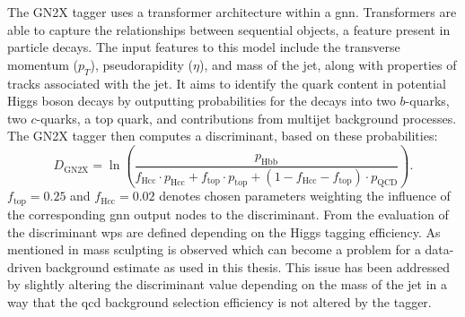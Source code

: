 The GN2X tagger uses a transformer architecture \citep{ATL-PHYS-PUB-2023-021} within a \ac{gnn}. Transformers are able to capture the relationships between sequential objects, a feature present in particle decays. The input features to this model include the transverse momentum ($p_T$), pseudorapidity ($\eta$), and mass of the jet, along with properties of tracks associated with the jet. It aims to identify the quark content in potential Higgs boson decays by outputting probabilities for the decays into two $b$-quarks, two $c$-quarks, a top quark, and contributions from multijet background processes. The GN2X tagger then computes a discriminant, based on these probabilities:
\begin{equation}
  D_{\text{GN2X}}=\ln\left({\frac{p_{\text{Hbb}}}{
    f_{\text{Hcc}}\cdot p_{\text{Hcc}}+
    f_{\text{top}}\cdot p_{\text{top}}+
    (1-f_{\text{Hcc}}-f_{\text{top}})\cdot p_{\text{QCD}}}}\right).
\end{equation}
$f_\text{top}=0.25$ and $f_\text{Hcc}=0.02$ denotes chosen parameters weighting the influence of the corresponding \ac{gnn} output nodes to the discriminant. From the evaluation of the discriminant \acp{wp} are defined depending on the Higgs tagging efficiency. As mentioned in \citep{ATL-PHYS-PUB-2023-021} mass sculpting is observed which can become a problem for a data-driven background estimate as used in this thesis. This issue has been addressed by slightly altering the discriminant value depending on the mass of the jet in a way that the \ac{qcd} background selection efficiency is not altered by the tagger. 


